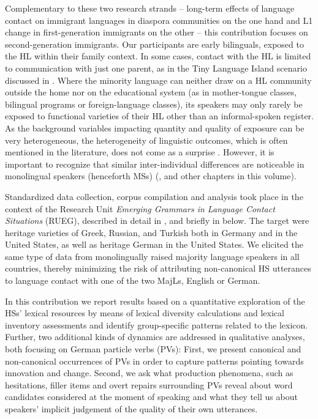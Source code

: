 \documentclass[output=paper,colorlinks,citecolor=brown]{langscibook}
\begin{document}
Complementary to these two research strands – long-term effects of language contact on immigrant languages in diaspora communities on the one hand and L1 change in first-generation immigrants on the other – this contribution focuses on second-generation immigrants. Our participants are early bilinguals, exposed to the HL within their family context. In some cases, contact with the HL is limited to communication with just one parent, as in the Tiny Language Island scenario discussed in . Where the minority language can neither draw on a HL community outside the home nor on the educational system (as in mother-tongue classes, bilingual programs or foreign-language classes), its speakers may only rarely be exposed to functional varieties of their HL other than an informal-spoken register. As the background variables impacting quantity and quality of exposure can be very heterogeneous, the heterogeneity of linguistic outcomes, which is often mentioned in the literature, does not come as a surprise \citep{Montrul2006Competence, Moreno-Fernandez2007Anglicismos, Fairclough2010Availability, Polinsky2018HeritageLanguages}. However, it is important to recognize that similar inter-individual differences are noticeable in monolingual speakers (henceforth MSs) (\citealt{ShadrovaEtAl2021,WieseEtAl2022}, and other chapters in this volume).

Standardized data collection, corpus compilation and analysis took place in the context of the Research Unit  \textit{Emerging Grammars in Language Contact Situations} (RUEG), described in detail in , \citet{Klotzetal2024} and briefly in  below. The target were heritage varieties of Greek, Russian, and Turkish both in Germany and in the United States, as well as heritage German in the United States. We elicited the same type of data from monolingually raised majority language speakers in all countries, thereby minimizing the risk of attributing non-canonical HS utterances to language contact with one of the two MajLs, English or German.

In this contribution we report results based on a quantitative exploration of the HSs' lexical resources by means of lexical diversity calculations and lexical inventory assessments and identify group-specific patterns related to the lexicon. Further, two additional kinds of dynamics are addressed in qualitative analyses, both focusing on German particle verbs (PVs): First, we present canonical and non-canonical occurrences of PVs in order to capture patterns pointing towards innovation and change. Second, we ask what production phenomena, such as hesitations, filler items and overt repairs surrounding PVs reveal about word candidates considered at the moment of speaking and what they tell us about speakers' implicit judgement of the quality of their own utterances.
\end{document}

